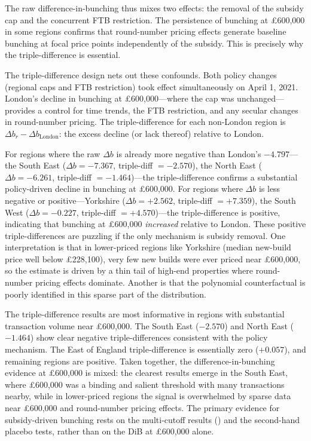 \documentclass[12pt]{article}
\begin{document}


The raw difference-in-bunching thus mixes two effects: the removal of the subsidy cap and the concurrent FTB restriction. The persistence of bunching at \pounds600,000 in some regions confirms that round-number pricing effects generate baseline bunching at focal price points independently of the subsidy. This is precisely why the triple-difference is essential.

The triple-difference design nets out these confounds. Both policy changes (regional caps and FTB restriction) took effect simultaneously on April 1, 2021. London's decline in bunching at \pounds600,000---where the cap was unchanged---provides a control for time trends, the FTB restriction, and any secular changes in round-number pricing. The triple-difference for each non-London region is $\Delta b_r - \Delta b_{\text{London}}$: the excess decline (or lack thereof) relative to London.

For regions where the raw $\Delta b$ is already more negative than London's $-4.797$---the South East ($\Delta b = -7.367$, triple-diff $= -2.570$), the North East ($\Delta b = -6.261$, triple-diff $= -1.464$)---the triple-difference confirms a substantial policy-driven decline in bunching at \pounds600,000. For regions where $\Delta b$ is less negative or positive---Yorkshire ($\Delta b = +2.562$, triple-diff $= +7.359$), the South West ($\Delta b = -0.227$, triple-diff $= +4.570$)---the triple-difference is positive, indicating that bunching at \pounds600,000 \textit{increased} relative to London. These positive triple-differences are puzzling if the only mechanism is subsidy removal. One interpretation is that in lower-priced regions like Yorkshire (median new-build price well below \pounds228,100), very few new builds were ever priced near \pounds600,000, so the estimate is driven by a thin tail of high-end properties where round-number pricing effects dominate. Another is that the polynomial counterfactual is poorly identified in this sparse part of the distribution.

The triple-difference results are most informative in regions with substantial transaction volume near \pounds600,000. The South East ($-2.570$) and North East ($-1.464$) show clear negative triple-differences consistent with the policy mechanism. The East of England triple-difference is essentially zero ($+0.057$), and remaining regions are positive. Taken together, the difference-in-bunching evidence at \pounds600,000 is mixed: the clearest results emerge in the South East, where \pounds600,000 was a binding and salient threshold with many transactions nearby, while in lower-priced regions the signal is overwhelmed by sparse data near \pounds600,000 and round-number pricing effects. The primary evidence for subsidy-driven bunching rests on the multi-cutoff results () and the second-hand placebo tests, rather than on the DiB at \pounds600,000 alone.
\end{document}
